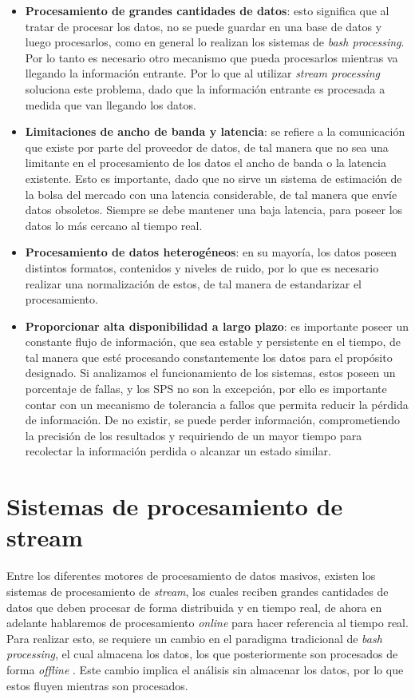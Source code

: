 \begin{itemize}
	\item \textbf{Procesamiento de grandes cantidades de datos}: esto significa que al tratar de procesar los datos, no se puede guardar en una base de datos y luego procesarlos, como en general lo realizan los sistemas de \textit{bash processing}. Por lo tanto es necesario otro mecanismo que pueda procesarlos mientras va llegando la información entrante. Por lo que al utilizar \textit{stream processing} soluciona este problema, dado que la información entrante es procesada a medida que van llegando los datos.
	\item \textbf{Limitaciones de ancho de banda y latencia}: se refiere a la comunicación que existe por parte del proveedor de datos, de tal manera que no sea una limitante en el procesamiento de los datos el ancho de banda o la latencia existente. Esto es importante, dado que no sirve un sistema de estimación de la bolsa del mercado con una latencia considerable, de tal manera que envíe datos obsoletos. Siempre se debe mantener una baja latencia, para poseer los datos lo más cercano al tiempo real.
	\item \textbf{Procesamiento de datos heterogéneos}: en su mayoría, los datos poseen distintos formatos, contenidos y niveles de ruido, por lo que es necesario realizar una normalización de estos, de tal manera de estandarizar el procesamiento.
	\item \textbf{Proporcionar alta disponibilidad a largo plazo}: es importante poseer un constante flujo de información, que sea estable y persistente en el tiempo, de tal manera que esté procesando constantemente los datos para el propósito designado. Si analizamos el funcionamiento de los sistemas, estos poseen un porcentaje de fallas, y los SPS no son la excepción, por ello es importante contar con un mecanismo de tolerancia a fallos que permita reducir la pérdida de información. De no existir, se puede perder información, comprometiendo la precisión de los resultados y requiriendo de un mayor tiempo para recolectar la información perdida o alcanzar un estado similar.
\end{itemize}

\section{Sistemas de procesamiento de stream}
\label{sec:SPS}

Entre los diferentes motores de procesamiento de datos masivos, existen los sistemas de procesamiento de \textsl{stream}, los cuales reciben grandes cantidades de datos que deben procesar de forma distribuida y en tiempo real, de ahora en adelante hablaremos de procesamiento \textsl{online} para hacer referencia al tiempo real. Para realizar esto, se requiere un cambio en el paradigma tradicional de \textsl{bash processing}, el cual almacena los datos, los que posteriormente son procesados de forma \textsl{offline} \citep{HawwashN14}. Este cambio implica el análisis sin almacenar los datos, por lo que estos fluyen mientras son procesados.

